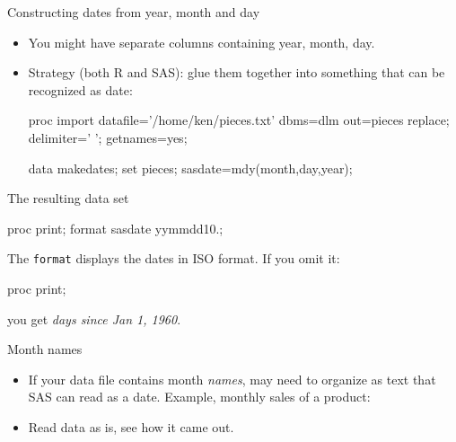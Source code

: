 \documentclass[unknownkeysallowed]{beamer}\usepackage[]{graphicx}\usepackage[]{color}
\begin{document}
\begin{frame}[fragile]{Constructing dates from year, month and day}
  
  \begin{itemize}
    
  \item You might have separate columns containing year, month, day.
  \item Strategy (both R and SAS): glue them together into something
    that can be recognized as date:
    \begin{Datastep}
proc import
  datafile='/home/ken/pieces.txt'
    dbms=dlm
    out=pieces
    replace;
  delimiter=' ';
  getnames=yes;
  
data makedates;
  set pieces;
  sasdate=mdy(month,day,year);
    \end{Datastep}
    
  \end{itemize}
  
\end{frame}

\begin{frame}[fragile]{The resulting data set}

    \begin{Sascode}[store=dd]
proc print;
  format sasdate yymmdd10.;
    \end{Sascode}


The \texttt{format} displays the dates in ISO format. If you omit it:

    \begin{Sascode}[store=dda]
proc print;
    \end{Sascode}


you get \emph{days since Jan 1, 1960}.
  
  
\end{frame}


\begin{frame}[fragile]{Month names}
  
  \begin{itemize}
  \item If your data file contains month \emph{names}, may need to
    organize as text that SAS can read as a date. 
    Example, monthly sales of a product:
    
    
    
  \item Read data as is, see how it came out.
  \end{itemize}
  
\end{frame}
\end{document}
